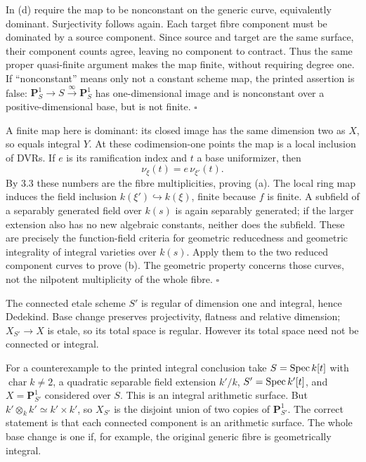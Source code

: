 \documentclass[11pt]{article}
\let\chapterexercise\exercise
\renewcommand{\exercise}[2]{\Needspace{8\baselineskip}\chapterexercise{#1}{#2}}
\begin{document}
In (d) require the map to be nonconstant on the generic curve, equivalently dominant. Surjectivity follows again. Each target fibre component must be dominated by a source component. Since source and target are the same surface, their component counts agree, leaving no component to contract. Thus the same proper quasi-finite argument makes the map finite, without requiring degree one. If ``nonconstant'' means only not a constant scheme map, the printed assertion is false: $\mathbf P^1_S\to S\xrightarrow{\infty}\mathbf P^1_S$ has one-dimensional image and is nonconstant over a positive-dimensional base, but is not finite. \hfill$\square$

\pf
A finite map here is dominant: its closed image has the same dimension two as $X$, so equals integral $Y$. At these codimension-one points the map is a local inclusion of DVRs. If $e$ is its ramification index and $t$ a base uniformizer, then
\[ \nu_\xi(t)=e\,\nu_{\xi'}(t). \]
By 3.3 these numbers are the fibre multiplicities, proving (a). The local ring map induces the field inclusion $k(\xi')\hookrightarrow k(\xi)$, finite because $f$ is finite. A subfield of a separably generated field over $k(s)$ is again separably generated; if the larger extension also has no new algebraic constants, neither does the subfield. These are precisely the function-field criteria for geometric reducedness and geometric integrality of integral varieties over $k(s)$. Apply them to the two reduced component curves to prove (b). The geometric property concerns those curves, not the nilpotent multiplicity of the whole fibre. \hfill$\square$

\pf
The connected etale scheme $S'$ is regular of dimension one and integral, hence Dedekind. Base change preserves projectivity, flatness and relative dimension; $X_{S'}\to X$ is etale, so its total space is regular. However its total space need not be connected or integral.

For a counterexample to the printed integral conclusion take $S=\operatorname{Spec} k[t]$ with $\operatorname{char}k\ne2$, a quadratic separable field extension $k'/k$, $S'=\operatorname{Spec} k'[t]$, and $X=\mathbf P^1_{S'}$ considered over $S$. This is an integral arithmetic surface. But $k'\otimes_kk'\simeq k'\times k'$, so $X_{S'}$ is the disjoint union of two copies of $\mathbf P^1_{S'}$. The correct statement is that each connected component is an arithmetic surface. The whole base change is one if, for example, the original generic fibre is geometrically integral.
\end{document}
